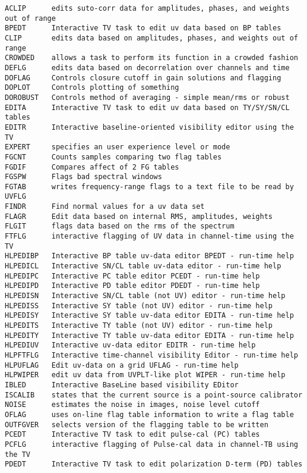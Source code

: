 \vskip 0.5pt
\bbve\begin{verbatim}
ACLIP      edits suto-corr data for amplitudes, phases, and weights out of range
BPEDT      Interactive TV task to edit uv data based on BP tables
CLIP       edits data based on amplitudes, phases, and weights out of range
CROWDED    allows a task to perform its function in a crowded fashion
DEFLG      edits data based on decorrelation over channels and time
DOFLAG     Controls closure cutoff in gain solutions and flagging
DOPLOT     Controls plotting of something
DOROBUST   Controls method of averaging - simple mean/rms or robust
EDITA      Interactive TV task to edit uv data based on TY/SY/SN/CL tables
EDITR      Interactive baseline-oriented visibility editor using the TV
EXPERT     specifies an user experience level or mode
FGCNT      Counts samples comparing two flag tables
FGDIF      Compares affect of 2 FG tables
FGSPW      Flags bad spectral windows
FGTAB      writes frequency-range flags to a text file to be read by UVFLG
FINDR      Find normal values for a uv data set
FLAGR      Edit data based on internal RMS, amplitudes, weights
FLGIT      flags data based on the rms of the spectrum
FTFLG      interactive flagging of UV data in channel-time using the TV
HLPEDIBP   Interactive BP table uv-data editor BPEDT - run-time help
HLPEDICL   Interactive SN/CL table uv-data editor - run-time help
HLPEDIPC   Interactive PC table editor PCEDT - run-time help
HLPEDIPD   Interactive PD table editor PDEDT - run-time help
HLPEDISN   Interactive SN/CL table (not UV) editor - run-time help
HLPEDISS   Interactive SY table (not UV) editor - run-time help
HLPEDISY   Interactive SY table uv-data editor EDITA - run-time help
HLPEDITS   Interactive TY table (not UV) editor - run-time help
HLPEDITY   Interactive TY table uv-data editor EDITA - run-time help
HLPEDIUV   Interactive uv-data editor EDITR - run-time help
HLPFTFLG   Interactive time-channel visibility Editor - run-time help
HLPUFLAG   Edit uv-data on a grid UFLAG - run-time help
HLPWIPER   edit uv data from UVPLT-like plot WIPER - run-time help
IBLED      Interactive BaseLine based visibility EDitor
ISCALIB    states that the current source is a point-source calibrator
NOISE      estimates the noise in images, noise level cutoff
OFLAG      uses on-line flag table information to write a flag table
OUTFGVER   selects version of the flagging table to be written
PCEDT      Interactive TV task to edit pulse-cal (PC) tables
PCFLG      interactive flagging of Pulse-cal data in channel-TB using the TV
PDEDT      Interactive TV task to edit polarization D-term (PD) tables

\end{verbatim}
